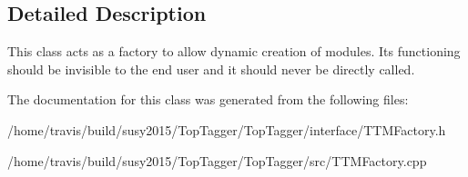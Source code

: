 \subsection{Detailed Description}
This class acts as a factory to allow dynamic creation of modules. Its functioning should be invisible to the end user and it should never be directly called. 

The documentation for this class was generated from the following files\-:\begin{DoxyCompactItemize}
\item 
/home/travis/build/susy2015/\-Top\-Tagger/\-Top\-Tagger/interface/T\-T\-M\-Factory.\-h\item 
/home/travis/build/susy2015/\-Top\-Tagger/\-Top\-Tagger/src/T\-T\-M\-Factory.\-cpp\end{DoxyCompactItemize}
